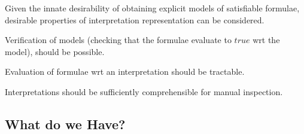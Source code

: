 \documentclass{easychair}
\newenvironment{packed_itemize}{
\vspace*{-0.3em}
\begin{itemize}
\setlength{\partopsep}{0pt}
\setlength{\itemsep}{1pt}
\setlength{\parskip}{0pt}
\setlength{\parsep}{0pt}
}{\end{itemize}}
\begin{document}
Given the innate desirability of obtaining explicit models of satisfiable formulae, desirable
properties of interpretation representation can be considered.
\begin{packed_itemize}
\item Verification of models (checking that the formulae evaluate to $true$ wrt the model), 
      should be possible.
\item Evaluation of formulae wrt an interpretation should be tractable.
\item Interpretations should be sufficiently comprehensible for manual inspection.
\end{packed_itemize}

\subsection{What do we Have?}
\label{Have}
\end{document}
